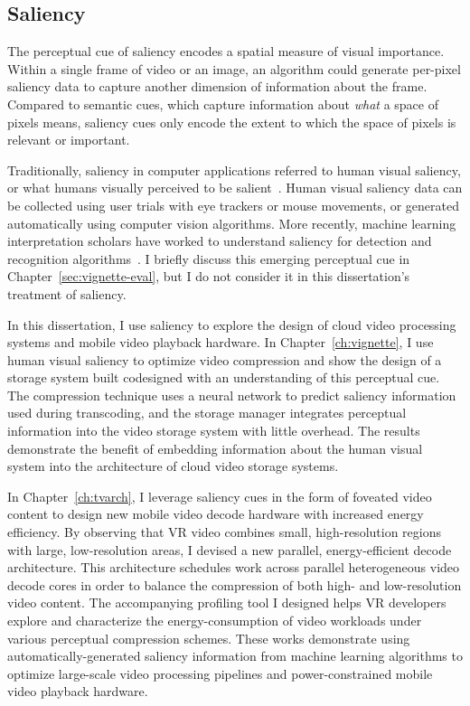\subsection{Saliency}
The perceptual cue of saliency encodes a spatial measure of visual importance.
Within a single frame of video or an image, an algorithm could generate per-pixel saliency data to capture another dimension of information about the frame.
Compared to semantic cues, which capture information about \emph{what} a space of pixels means, saliency cues only encode the extent to which the space of pixels is relevant or important.

Traditionally, saliency in computer applications referred to human visual saliency, or what humans visually perceived to be salient~\cite{itti1998model}.
Human visual saliency data can be collected using user trials with eye trackers or mouse movements, or generated automatically using computer vision algorithms.
More recently, machine learning interpretation scholars have worked to understand saliency for detection and recognition algorithms~\cite{bylinskii2016saliency}.
I briefly discuss this emerging perceptual cue in Chapter~\ref{sec:vignette-eval}, but I do not consider it in this dissertation's treatment of saliency.

In this dissertation, I use saliency to explore the design of cloud video processing systems and mobile video playback hardware.
In Chapter~\ref{ch:vignette}, I use human visual saliency to optimize video compression and show the design of a storage system built codesigned with an understanding of this perceptual cue.
The compression technique uses a neural network to predict saliency information used during transcoding, and the storage manager integrates perceptual information into the video storage system with little overhead.
The results demonstrate the benefit of embedding information about the human visual system into the architecture of cloud video storage systems.

In Chapter~\ref{ch:tvarch}, I leverage saliency cues in the form of foveated video content to design new mobile video decode hardware with increased energy efficiency.
By observing that VR video combines small, high-resolution regions with large, low-resolution areas, I devised a new parallel, energy-efficient decode architecture.
This architecture schedules work across parallel heterogeneous video decode cores in order to balance the compression of both high- and low-resolution video content.
The accompanying profiling tool I designed helps VR developers explore and characterize the energy-consumption of video workloads under various perceptual compression schemes.
These works demonstrate using automatically-generated saliency information from machine learning algorithms to optimize large-scale video processing pipelines and power-constrained mobile video playback hardware.

